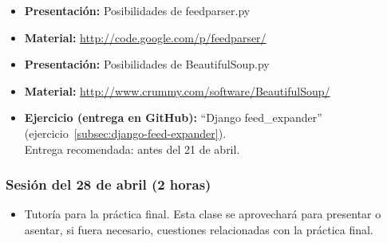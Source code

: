 \documentclass[a4paper,12pt]{article}
\begin{document}
\begin{itemize}
  \item \textbf{Presentación:} Posibilidades de feedparser.py
  \item \textbf{Material:} \url{http://code.google.com/p/feedparser/}
  \item \textbf{Presentación:} Posibilidades de BeautifulSoup.py
  \item \textbf{Material:} \url{http://www.crummy.com/software/BeautifulSoup/}
  \item \textbf{Ejercicio (entrega en GitHub):} ``Django feed\_expander'' (ejercicio~\ref{subsec:django-feed-expander}). \\
  Entrega recomendada: antes del 21 de abril.
\end{itemize}


\subsubsection{Sesión del 28 de abril (2 horas)}

\begin{itemize}
  \item Tutoría para la práctica final. Esta clase se aprovechará para presentar o asentar, si fuera necesario, cuestiones relacionadas con la práctica final.
\end{itemize}

%
%


%

\end{document}
